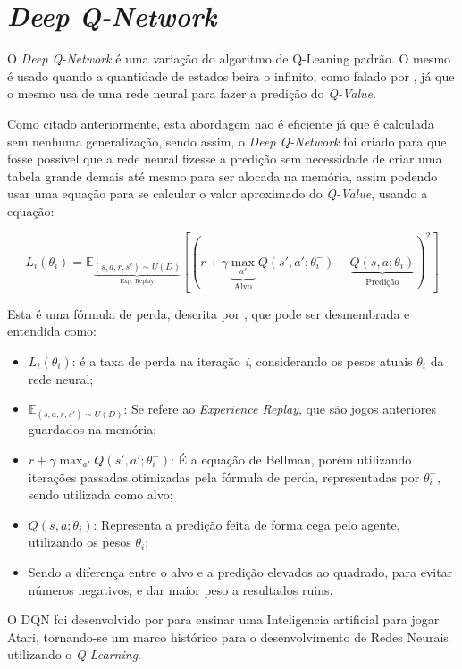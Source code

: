 \section{\textit{Deep Q-Network}}
O \textit{Deep Q-Network} é uma variação do algoritmo de Q-Leaning padrão. O mesmo é usado quando a quantidade de estados beira o infinito, como falado por , já que o mesmo usa de uma rede neural para fazer a predição do \textit{Q-Value}.

Como citado anteriormente, esta abordagem não é eficiente já que é calculada sem nenhuma generalização, sendo assim, o \textit{Deep Q-Network} foi criado para que fosse possível que a rede neural fizesse a predição sem necessidade de criar uma tabela grande demais até mesmo para ser alocada na memória, assim podendo usar uma equação para se calcular o valor aproximado do \textit{Q-Value}, usando a equação:

$$L_i(\theta_i) = \mathbb{E}_{\underbrace{(s,a,r,s') \sim U(D)}_{\text{Exp. Replay}}} \left[ \left( r + \gamma \underbrace{\max_{a'}}_{\text{Alvo}} Q(s', a'; \theta_i^-) - \underbrace{Q(s, a; \theta_i)}_{\text{Predição}} \right)^2 \right]$$

Esta é uma fórmula de perda, descrita por , que pode ser desmembrada e entendida como:

\begin{itemize}
      \item $L_i(\theta_i)$: é a taxa de perda na iteração \textit{i}, considerando os pesos atuais $\theta_i$ da rede neural;
      \item  $ \mathbb{E}_{(s,a,r,s') \sim U(D)} $: Se refere ao \textit{Experience Replay}, que são jogos anteriores guardados na memória;
      \item $ r + \gamma {\max_{a'}} Q(s', a'; \theta_i^-)$: É a equação de Bellman, porém utilizando iterações passadas otimizadas pela fórmula de perda, representadas por $\theta_i^-$, sendo utilizada como alvo;
      \item $ Q(s, a; \theta_i) $: Representa a predição feita de forma cega pelo agente, utilizando os pesos $\theta_i$;
      \item Sendo a diferença entre o alvo e a predição elevados ao quadrado, para evitar números negativos, e dar maior peso a resultados ruins.
\end{itemize}

O \gls{DQN} foi desenvolvido por  para ensinar uma Inteligencia artificial para jogar Atari, tornando-se um marco histórico para o desenvolvimento de Redes Neurais utilizando o \textit{Q-Learning}.

